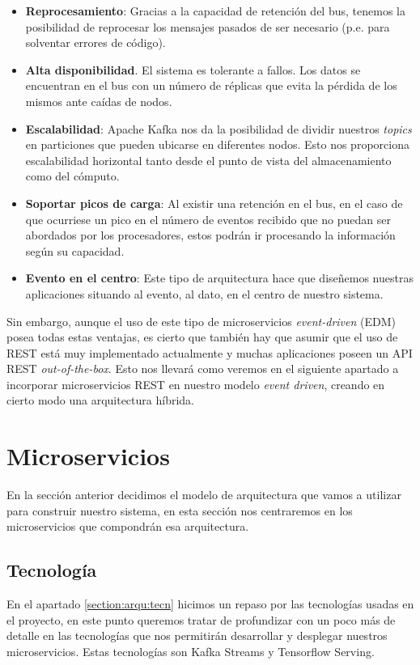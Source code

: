 \begin{itemize}
	\item \textbf{Reprocesamiento}: Gracias a la capacidad de retención del bus, tenemos la posibilidad de reprocesar los mensajes pasados de ser necesario (p.e. para solventar errores de código).  
	\item \textbf{Alta disponibilidad}. El sistema es tolerante a fallos. Los datos se encuentran en el bus con un número de réplicas que evita la pérdida de los mismos ante caídas de nodos.
	\item \textbf{Escalabilidad}: Apache Kafka nos da la posibilidad de dividir nuestros \textit{topics} en particiones que pueden ubicarse en diferentes nodos. Esto nos proporciona escalabilidad horizontal tanto desde el punto de vista del almacenamiento como del cómputo.
	\item\textbf{ Soportar picos de carga}: Al existir una retención en el bus, en el caso de que ocurriese un pico en el número de eventos recibido que no puedan ser abordados por los procesadores, estos podrán ir procesando la información según su capacidad.
	\item \textbf{Evento en el centro}: Este tipo de arquitectura hace que diseñemos nuestras aplicaciones situando al evento, al dato, en el centro de nuestro sistema.
\end{itemize}


Sin embargo, aunque el uso de este tipo de microservicios  \textit{event-driven} (EDM) posea todas estas ventajas, es cierto que también hay que asumir que el uso de REST está muy implementado actualmente y muchas aplicaciones poseen un API REST \textit{out-of-the-box}. Esto nos llevará como veremos en el siguiente apartado a incorporar microservicios REST en nuestro modelo \textit{event driven}, creando en cierto modo una arquitectura híbrida.





\section{Microservicios}
En la sección anterior decidimos el modelo de arquitectura que vamos a utilizar para construir nuestro sistema, en esta sección nos centraremos en los microservicios que compondrán esa arquitectura.  

\subsection{Tecnología}
En el apartado \ref{section:arqu:tecn} hicimos un repaso por las tecnologías usadas en el proyecto, en este punto queremos tratar de profundizar con un poco más de detalle en las tecnologías que nos permitirán desarrollar y desplegar nuestros microservicios. Estas tecnologías son Kafka Streams y Tensorflow Serving.

